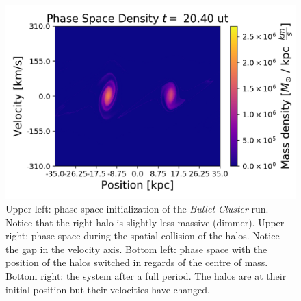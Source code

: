 \begin{figure}[h!]
    \includegraphics[scale=0.45]{imag/bullet51.png}
    \caption{Upper left: phase space initialization of the \emph{Bullet Cluster} run. Notice that the right halo is slightly less massive (dimmer). Upper right: phase space during the spatial collision of the halos. Notice the gap in the velocity axis. Bottom left: phase space with the position of the halos switched in regards of the centre of mass. Bottom right: the system after a full period. The halos are at their initial position but their velocities have changed.}
    \label{phaseNoColBullet}
\end{figure}

